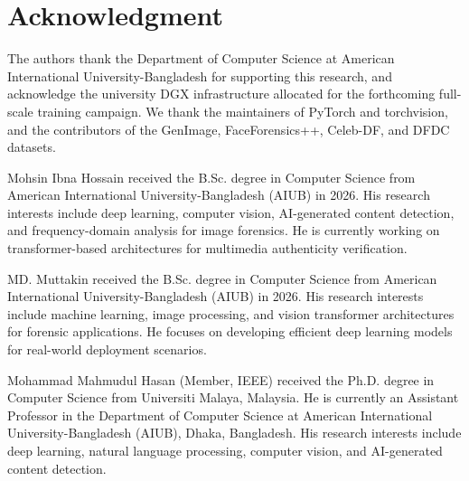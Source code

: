 \documentclass[journal]{IEEEtran}
\begin{document}
\section*{Acknowledgment}
The authors thank the Department of Computer Science at American International University-Bangladesh for supporting this research, and acknowledge the university DGX infrastructure allocated for the forthcoming full-scale training campaign. We thank the maintainers of PyTorch and torchvision, and the contributors of the GenImage, FaceForensics++, Celeb-DF, and DFDC datasets.

\begin{IEEEbiography}{Mohsin Ibna Hossain}
received the B.Sc. degree in Computer Science from American International University-Bangladesh (AIUB) in 2026. His research interests include deep learning, computer vision, AI-generated content detection, and frequency-domain analysis for image forensics. He is currently working on transformer-based architectures for multimedia authenticity verification.
\end{IEEEbiography}

\begin{IEEEbiography}{MD. Muttakin}
received the B.Sc. degree in Computer Science from American International University-Bangladesh (AIUB) in 2026. His research interests include machine learning, image processing, and vision transformer architectures for forensic applications. He focuses on developing efficient deep learning models for real-world deployment scenarios.
\end{IEEEbiography}

\begin{IEEEbiography}{Mohammad Mahmudul Hasan}
(Member, IEEE) received the Ph.D. degree in Computer Science from Universiti Malaya, Malaysia. He is currently an Assistant Professor in the Department of Computer Science at American International University-Bangladesh (AIUB), Dhaka, Bangladesh. His research interests include deep learning, natural language processing, computer vision, and AI-generated content detection.
\end{IEEEbiography}
\end{document}
